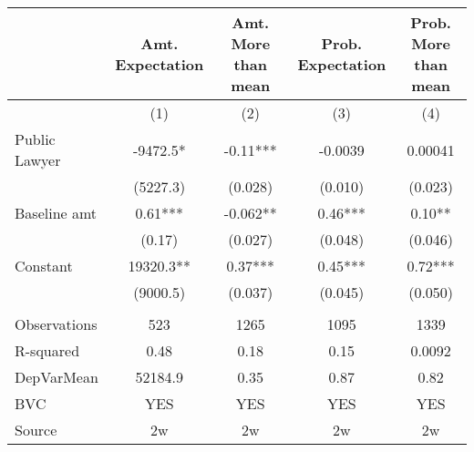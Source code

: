 \begin{tabular}{lcccc}
\toprule
      & Amt. Expectation & Amt. More than mean & Prob. Expectation & Prob. More than mean \\
\midrule
\midrule
      & (1)   & (2)   & (3)   & (4) \\
\midrule
\midrule
Public Lawyer & -9472.5* & -0.11*** & -0.0039 & 0.00041 \\
      & (5227.3) & (0.028) & (0.010) & (0.023) \\
Baseline amt   & 0.61*** & -0.062** & 0.46*** & 0.10** \\
      & (0.17) & (0.027) & (0.048) & (0.046) \\
Constant & 19320.3** & 0.37*** & 0.45*** & 0.72*** \\
      & (9000.5) & (0.037) & (0.045) & (0.050) \\
      &       &       &       &  \\
\midrule
Observations & 523   & 1265  & 1095  & 1339 \\
R-squared & 0.48  & 0.18  & 0.15  & 0.0092 \\
DepVarMean & 52184.9 & 0.35  & 0.87  & 0.82 \\
BVC   & YES   & YES   & YES   & YES \\
Source & 2w    & 2w    & 2w    & 2w \\
\bottomrule
\bottomrule
\end{tabular}%

